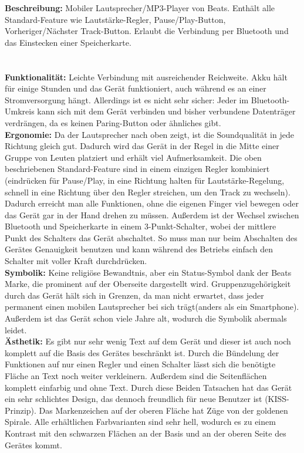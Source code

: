 \documentclass[a4paper,10pt]{article}
\begin{document}
\textbf{Beschreibung:} Mobiler Lautsprecher/MP3-Player von Beats. Enthält alle Standard-Feature wie Lautstärke-Regler, Pause/Play-Button, Vorheriger/Nächster Track-Button. Erlaubt die Verbindung per Bluetooth und das Einstecken einer Speicherkarte. 
\\
\\
\\
\textbf{Funktionalität:} Leichte Verbindung mit ausreichender Reichweite. Akku hält für einige Stunden und das Gerät funktioniert, auch während es an einer Stromversorgung hängt. Allerdings ist es nicht sehr sicher: Jeder im Bluetooth-Umkreis kann sich mit dem Gerät verbinden und bisher verbundene Datenträger verdrängen, da es keinen Paring-Button oder ähnliches gibt.
\\
\textbf{Ergonomie:} Da der Lautsprecher nach oben zeigt, ist die Soundqualität in jede Richtung gleich gut. Dadurch wird das Gerät in der Regel in die Mitte einer Gruppe von Leuten platziert und erhält viel Aufmerksamkeit. Die oben beschriebenen Standard-Feature sind in einem einzigen Regler kombiniert (eindrücken für Pause/Play, in eine Richtung halten für Lautstärke-Regelung, schnell in eine Richtung über den Regler streichen, um den Track zu wechseln). Dadurch erreicht man alle Funktionen, ohne die eigenen Finger viel bewegen oder das Gerät gar in der Hand drehen zu müssen. Außerdem ist der Wechsel zwischen Bluetooth und Speicherkarte in einem 3-Punkt-Schalter, wobei der mittlere Punkt des Schalters das Gerät abschaltet. So muss man nur beim Abschalten des Gerätes Genauigkeit benutzen und kann während des Betriebs einfach den Schalter mit voller Kraft durchdrücken.
\\
\textbf{Symbolik:} Keine religiöse Bewandtnis, aber ein Status-Symbol dank der Beats Marke, die prominent auf der Oberseite dargestellt wird. Gruppenzugehörigkeit durch das Gerät hält sich in Grenzen, da man nicht erwartet, dass jeder permanent einen mobilen Lautsprecher bei sich trägt(anders als ein Smartphone). Außerdem ist das Gerät schon viele Jahre alt, wodurch die Symbolik abermals leidet.
\\
\textbf{Ästhetik:} Es gibt nur sehr wenig Text auf dem Gerät und dieser ist auch noch komplett auf die Basis des Gerätes beschränkt ist. Durch die Bündelung der Funktionen auf nur einen Regler und einen Schalter lässt sich die benötigte Fläche an Text noch weiter verkleinern. Außerdem sind die Seitenflächen komplett einfarbig und ohne Text. Durch diese Beiden Tatsachen hat das Gerät ein sehr schlichtes Design, das dennoch freundlich für neue Benutzer ist (KISS-Prinzip). Das Markenzeichen auf der oberen Fläche hat Züge von der goldenen Spirale. Alle erhältlichen Farbvarianten sind sehr hell, wodurch es zu einem Kontrast mit den schwarzen Flächen an der Basis und an der oberen Seite des Gerätes kommt.
\end{document}
